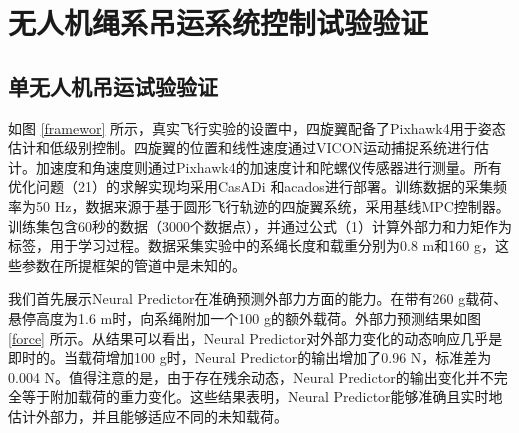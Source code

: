 \documentclass[lang=chs, degree=master, blindreview=false, winfonts=true]{yanputhesis}
\begin{document}




\section{无人机绳系吊运系统控制试验验证}
\subsection{单无人机吊运试验验证}
如图 \ref{framewor} 所示，真实飞行实验的设置中，四旋翼配备了Pixhawk4用于姿态估计和低级别控制。四旋翼的位置和线性速度通过VICON运动捕捉系统进行估计。加速度和角速度则通过Pixhawk4的加速度计和陀螺仪传感器进行测量。所有优化问题（21）的求解实现均采用CasADi \cite{Andersson2019}和acados\cite{Verschueren2022}进行部署。训练数据的采集频率为50 Hz，数据来源于基于圆形飞行轨迹的四旋翼系统，采用基线MPC控制器。训练集包含60秒的数据（3000个数据点），并通过公式（1）计算外部力和力矩作为标签，用于学习过程。数据采集实验中的系绳长度和载重分别为0.8 m和160 g，这些参数在所提框架的管道中是未知的。

我们首先展示Neural Predictor在准确预测外部力方面的能力。在带有260 g载荷、悬停高度为1.6 m时，向系绳附加一个100 g的额外载荷。外部力预测结果如图 \ref{force} 所示。从结果可以看出，Neural Predictor对外部力变化的动态响应几乎是即时的。当载荷增加100 g时，Neural Predictor的输出增加了0.96 N，标准差为0.004 N。值得注意的是，由于存在残余动态，Neural Predictor的输出变化并不完全等于附加载荷的重力变化。这些结果表明，Neural Predictor能够准确且实时地估计外部力，并且能够适应不同的未知载荷。
\end{document}
